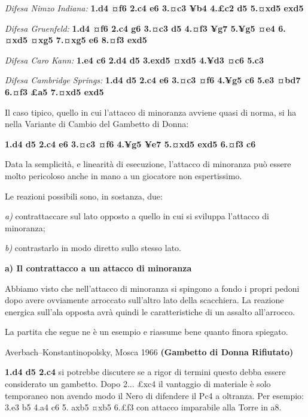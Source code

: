 \emph{Difesa Nimzo Indiana:} \textbf{1.d4 ¤f6 2.c4 e6 3.¤c3 ¥b4 4.£c2 d5
5.¤xd5 exd5}

\emph{Difesa Gruenfeld:} \textbf{1.d4 ¤f6 2.c4 g6 3.¤c3 d5 4.¤f3 ¥g7
5.¥g5 ¤e4 6.¤xd5 ¤xg5 7.¤xg5 e6 8.¤f3 exd5}


\emph{Difesa Caro Kann:} \textbf{1.e4 c6 2.d4 d5 3.exd5 ¤xd5 4.¥d3 ¤c6
5.c3}


\emph{Difesa Cambridge Springs:} \textbf{1.d4 d5 2.c4 e6 3.¤c3 ¤f6 4.¥g5
c6 5.e3 ¤bd7 6.¤f3 £a5 7.¤xd5 exd5}


Il caso tipico, quello in cui l'attacco di minoranza avviene quasi di
norma, si ha nella Variante di Cambio del Gambetto di Donna:

\textbf{1.d4 d5 2.c4 e6 3.¤c3 ¤f6 4.¥g5 ¥e7 5.¤xd5 exd5 6.¤f3 c6}


Data la semplicità, e linearità di esecuzione, l'attacco di minoranza
può essere molto pericoloso anche in mano a un giocatore non
espertissimo.

Le reazioni possibili sono, in sostanza, due:

\emph{a)} contrattaccare sul lato opposto a quello in cui si sviluppa
l'attacco di minoranza;

\emph{b)} contrastarlo in modo diretto sullo stesso lato.

\textbf{a) Il contrattacco a un attacco di minoranza}

Abbiamo visto che nell'attacco di minoranza si spingono a fondo i propri
pedoni dopo avere ovviamente arroccato sull'altro lato della scacchiera.
La reazione energica sull'ala opposta avrà quindi le caratteristiche di
un assalto all'arrocco.

La partita che segue ne è un esempio e riassume bene quanto finora
spiegato.

Averbach--Konstantinopolsky, Mosca 1966 \textbf{(Gambetto di Donna
Rifiutato)}

\textbf{1.d4 d5 2.c4} si potrebbe discutere se a rigor di termini questo
debba essere considerato un gambetto. Dopo 2... £xc4 il vantaggio di
materiale è solo temporaneo non avendo modo il Nero di difendere il Pc4
a oltranza. Per esempio: 3.e3 b5 4.a4 c6 5. axb5 ¤xb5 6.£f3 con attacco
imparabile alla Torre in a8.

